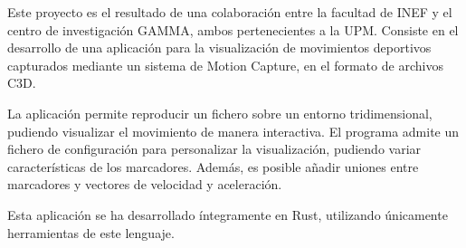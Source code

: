Este proyecto es el resultado de una colaboración entre la facultad de \acs{INEF} y el centro de investigación \acs{GAMMA}, ambos pertenecientes a la \acs{UPM}. Consiste en el desarrollo de una aplicación para la visualización de movimientos deportivos capturados mediante un sistema de Motion Capture, en el formato de archivos \acs{C3D}. 

La aplicación permite reproducir un fichero sobre un entorno tridimensional, pudiendo visualizar el movimiento de manera interactiva. El programa admite un fichero de configuración para personalizar la visualización, pudiendo variar características de los marcadores. Además, es posible añadir uniones entre marcadores y vectores de velocidad y aceleración. 

Esta aplicación se ha desarrollado íntegramente en Rust, utilizando únicamente herramientas de este lenguaje.